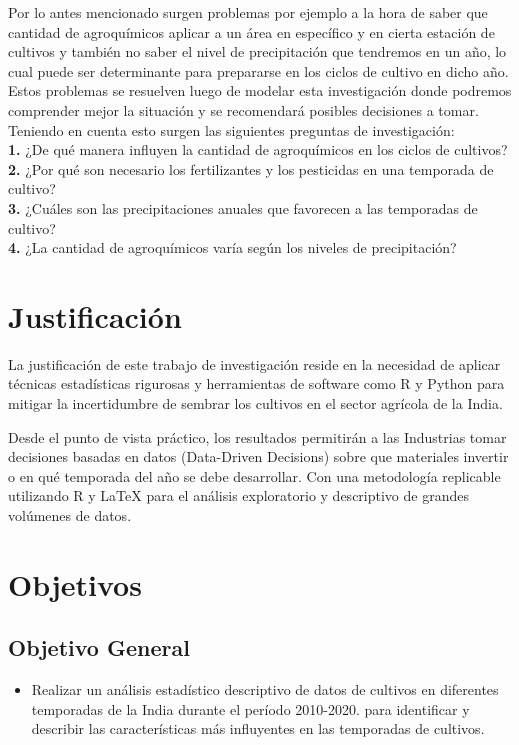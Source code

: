 \documentclass[oneside,11pt]{Latex/Classes/PhDthesisPSnPDF}
\begin{document}
Por lo antes mencionado surgen problemas por ejemplo a la hora de saber
que cantidad de agroquímicos aplicar a un área en específico y en cierta
estación de cultivos y también no saber el nivel de precipitación que
tendremos en un año, lo cual puede ser determinante para prepararse en
los ciclos de cultivo en dicho año.\\

Estos problemas se resuelven luego de modelar esta investigación donde
podremos comprender mejor la situación y se recomendará posibles
decisiones a tomar. Teniendo en cuenta esto surgen las siguientes
preguntas de investigación:\\

\textbf{1.} ¿De qué manera influyen la cantidad de agroquímicos en los
ciclos de cultivos?\\

\textbf{2.} ¿Por qué son necesario los fertilizantes y los pesticidas en
una temporada de cultivo?\\

\textbf{3.} ¿Cuáles son las precipitaciones anuales que favorecen a las
temporadas de cultivo?\\

\textbf{4.} ¿La cantidad de agroquímicos varía según los niveles de
precipitación?\\

\section{Justificación}

La justificación de este trabajo de investigación reside en la necesidad
de aplicar técnicas estadísticas rigurosas y herramientas de software
como R y Python para mitigar la incertidumbre de sembrar los cultivos en
el sector agrícola de la India.

Desde el punto de vista práctico, los resultados permitirán a las
Industrias tomar decisiones basadas en datos (Data-Driven Decisions)
sobre que materiales invertir o en qué temporada del año se debe
desarrollar. Con una metodología replicable utilizando R y LaTeX para el
análisis exploratorio y descriptivo de grandes volúmenes de datos.\\

\section{Objetivos}

\subsection{Objetivo General}
\begin{itemize}
  \item{Realizar un análisis estadístico descriptivo de datos de cultivos en diferentes temporadas de la India durante el período 2010-2020.  para identificar y describir las características más influyentes en las temporadas de cultivos. }
\end{itemize}
\end{document}
